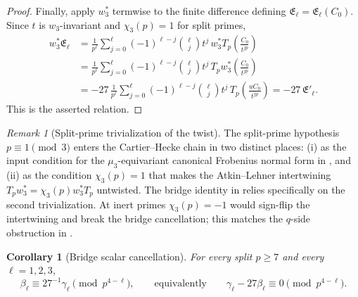 \documentclass[11pt]{amsart}
\newtheorem{corollary}[theorem]{Corollary}
\theoremstyle{definition}
\theoremstyle{remark}
\newtheorem{remark}[theorem]{Remark}
\begin{document}
\begin{proof}
Finally, apply $w_3^*$ termwise to the finite difference defining $\mathfrak E_\ell=\mathfrak E_\ell(C_0)$. Since $t$ is $w_3$-invariant and $\chi_3(p)=1$ for split primes,
\[
\begin{aligned}
w_3^*\mathfrak E_\ell&=\frac{1}{p^\ell}\sum_{j=0}^\ell(-1)^{\ell-j}\binom{\ell}{j}t^j\,w_3^*T_p\!\left(\frac{C_0}{t^{jp}}\right)\\
&=\frac{1}{p^\ell}\sum_{j=0}^\ell(-1)^{\ell-j}\binom{\ell}{j}t^j\,T_p w_3^*\!\left(\frac{C_0}{t^{jp}}\right)\\
&=-27\,\frac{1}{p^\ell}\sum_{j=0}^\ell(-1)^{\ell-j}\binom{\ell}{j}t^j\,T_p\!\left(\frac{uC_0}{t^{jp}}\right)=-27\,\mathfrak E'_\ell.
\end{aligned}
\]
This is the asserted relation.
\end{proof}

\begin{remark}[Split-prime trivialization of the twist]\label{rem:split-trivialization}
The split-prime hypothesis $p\equiv 1\pmod 3$ enters the Cartier--Hecke chain in two distinct places: (i) as the input condition for the $\mu_3$-equivariant canonical Frobenius normal form in , and (ii) as the condition $\chi_3(p)=1$ that makes the Atkin--Lehner intertwining $T_pw_3^*=\chi_3(p)w_3^*T_p$ untwisted. The bridge identity in  relies specifically on the second trivialization. At inert primes $\chi_3(p)=-1$ would sign-flip the intertwining and break the bridge cancellation; this matches the $q$-side obstruction in .
\end{remark}

\begin{corollary}[Bridge scalar cancellation]\label{cor:bridge-scalar}
For every split $p\ge 7$ and every $\ell=1,2,3$,
\[
\beta_\ell\equiv 27^{-1}\gamma_\ell\pmod{p^{4-\ell}},\qquad\text{equivalently}\qquad \gamma_\ell-27\beta_\ell\equiv 0\pmod{p^{4-\ell}}.
\]
\end{corollary}
\end{document}
